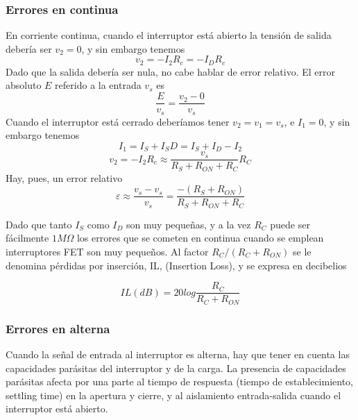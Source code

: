 \subsubsection{Errores en continua}
En corriente continua, cuando el interruptor está abierto la tensión de salida debería ser $v_2 = 0$, y sin embargo tenemos
\begin{equation}
    v_2 = -I_2 R_c = -I_D R_c
\end{equation}
Dado que la salida debería ser nula, no cabe hablar de error relativo. El error absoluto $E$ referido a la entrada $v_s$ es
\begin{equation}
    \frac{E}{v_s} = \frac{v_2 - 0}{v_s}
\end{equation}
Cuando el interruptor está cerrado deberíamos tener $v_2 = v_1 = v_s$, e $I_1 = 0$, y sin embargo tenemos
\begin{equation}
    I_1 = I_S + I_SD = I_S + I_D - I_2
\end{equation}
\begin{equation}
    v_2 = -I_2 R_c \approx \frac{v_s}{R_S + R_{ON} + R_C} R_C 
\end{equation}
Hay, pues, un error relativo
\begin{equation}
    \varepsilon \approx \frac{v_s - v_s}{v_s} = \frac{- (R_S + R_{ON})}{R_S + R_{ON} + R_C}
\end{equation}

Dado que tanto $I_S$ como $I_D$ son muy pequeñas, y a la vez $R_C$ puede ser fácilmente $1M\Omega$ los errores que se cometen en continua cuando se emplean interruptores FET son muy pequeños. Al factor $R_C/(R_C + R_{ON})$ se le denomina pérdidas por inserción, IL, (Insertion Loss), y se expresa en decibelios

\begin{equation}
    IL (dB) = 20 log \frac{R_C}{R_C + R_{ON}}
\end{equation}

\subsubsection{Errores en alterna}

Cuando la señal de entrada al interruptor es alterna, hay que tener en cuenta las capacidades parásitas del interruptor y de la carga. La presencia de capacidades parásitas afecta por una parte al tiempo de respuesta (tiempo de establecimiento, settling time) en la apertura y cierre, y al aislamiento entrada-salida cuando el interruptor está abierto.

